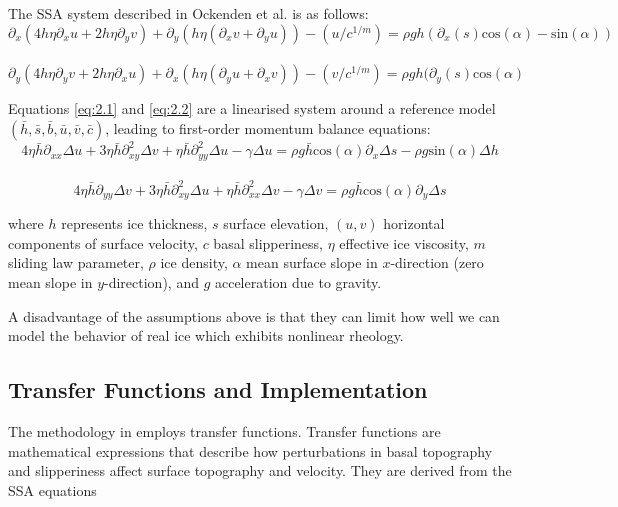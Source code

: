 The SSA system described in Ockenden et al.\cite{Ockenden_2022} is as follows:
\begin{equation}\partial_{x} (4 h \eta \partial_{x} u + 2 h \eta \partial_y v) + \partial_{y}(h \eta( \partial_{x} v + \partial_{y} u)) - (u/c^{1/m}) = \rho g h ( \partial_{x} (s) \mathrm{cos}(\alpha) - \mathrm{sin}(\alpha))
\end{equation}\label{eq:2.1}\\
\begin{equation}\partial_{y} (4 h \eta \partial_{y} v + 2 h \eta \partial_x u) + \partial_{x}(h \eta( \partial_{y} u + \partial_{x} v)) - (v/c^{1/m}) = \rho g h ( \partial_{y} (s) \mathrm{cos}(\alpha)
\end{equation}\label{eq:2.2}

Equations \ref{eq:2.1} and \ref{eq:2.2} are a linearised system around a reference model $(\bar{h}, \bar{s}, \bar{b}, \bar{u}, \bar{v}, \bar{c})$, leading to first-order momentum balance equations:
\begin{equation}
4 \eta \bar{h} \partial_{xx} \Delta u + 3 \eta \bar{h} \partial_{xy}^{2} \Delta v + \eta \bar{h} \partial_{yy}^{2}\Delta u -\gamma \Delta u  = \rho g \bar{h}\mathrm{cos}(\alpha) \partial_x \Delta s - \rho g \mathrm{sin}(\alpha)\Delta h
\end{equation}\\
\begin{equation}
4 \eta \bar{h} \partial_{yy} \Delta v + 3 \eta \bar{h} \partial_{xy}^{2} \Delta u + \eta \bar{h} \partial_{xx}^{2}\Delta v -\gamma \Delta v  = \rho g \bar{h}\mathrm{cos}(\alpha) \partial_y \Delta s
\end{equation}

where $h$ represents ice thickness, $s$ surface elevation, $(u, v)$ horizontal components of surface velocity, $c$ basal slipperiness, $\eta$ effective ice viscosity, $m$ sliding law parameter, $\rho$ ice density, $\alpha$ mean surface slope in $x$-direction (zero mean slope in $y$-direction), and $g$ acceleration due to gravity.

A disadvantage of the  assumptions above is that they can limit how well we can model the behavior of real ice which exhibits nonlinear rheology.

\subsection*{Transfer Functions and Implementation}

The methodology in \cite{Ockenden_2022} employs transfer functions. Transfer functions are mathematical expressions that describe how perturbations in basal topography and slipperiness affect surface topography and velocity. They are derived from the SSA equations

